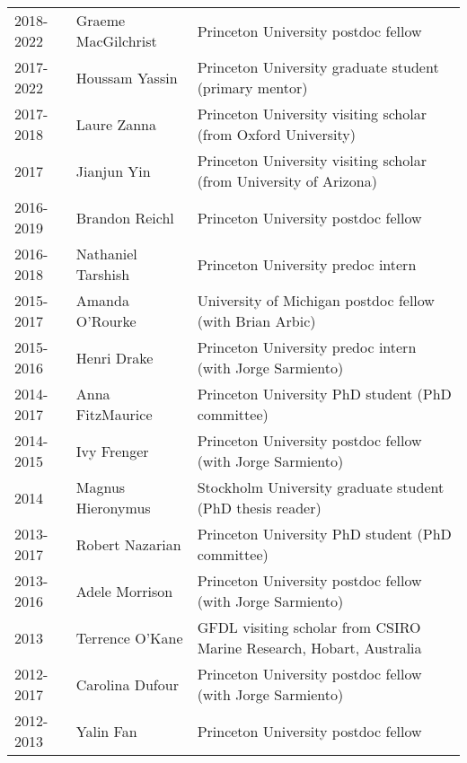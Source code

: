 \documentclass{article}
\begin{document}
\begin{tabular}{lll}
2018-2022 & Graeme MacGilchrist & Princeton University postdoc fellow \\ 

2017-2022 & Houssam Yassin & Princeton University graduate student (primary mentor) \\ 

2017-2018 & Laure Zanna  & Princeton University visiting scholar (from Oxford University)  \\

2017 & Jianjun Yin       & Princeton University visiting scholar (from University of Arizona)  \\

2016-2019 & Brandon Reichl       & Princeton University postdoc fellow  \\

2016-2018 & Nathaniel Tarshish & Princeton University predoc intern \\

2015-2017 & Amanda O'Rourke  & University of Michigan postdoc fellow (with Brian Arbic) \\

2015-2016    & Henri Drake             & Princeton University predoc intern (with Jorge Sarmiento) \\

2014-2017 & Anna FitzMaurice   & Princeton University PhD student (PhD committee) \\ 

2014-2015     & Ivy Frenger            & Princeton University postdoc fellow (with Jorge Sarmiento) \\

2014 & Magnus Hieronymus& Stockholm University graduate student (PhD thesis reader) \\ 

2013-2017 & Robert Nazarian    & Princeton University PhD student (PhD committee) \\ 

2013-2016     & Adele Morrison     & Princeton University postdoc fellow (with Jorge Sarmiento) \\

2013               & Terrence O'Kane   & GFDL visiting scholar from CSIRO Marine Research, Hobart, Australia \\

2012-2017     & Carolina Dufour   & Princeton University postdoc fellow (with Jorge Sarmiento)  \\

2012-2013     & Yalin Fan              & Princeton University postdoc fellow  \\


\end{tabular}
\end{document}
